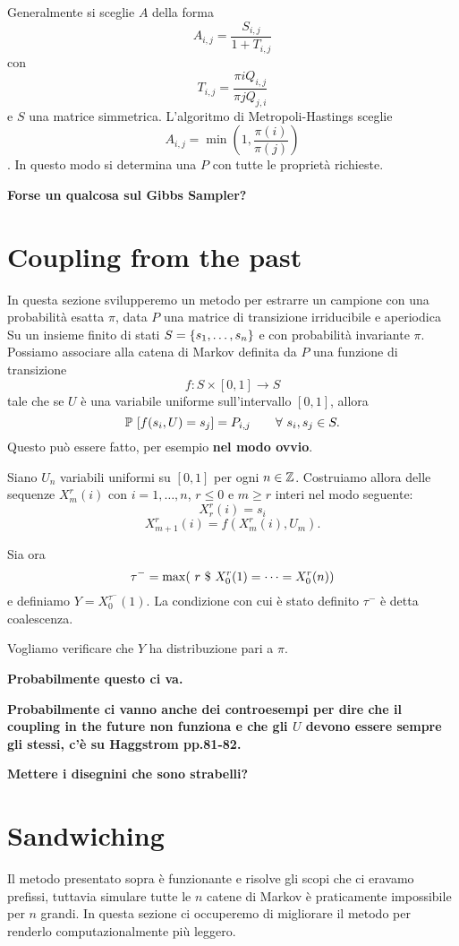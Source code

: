 \documentclass[]{marticle}
\begin{document}
Generalmente si sceglie $A$ della forma
\[
    A_{i,j} = \frac{S_{i,j}}{1+T_{i,j}}
\]
con
\[
    T_{i, j} = \frac{\pi{i} Q_{i,j}}{\pi{j} Q_{j,i}}
\]
e $S$ una matrice simmetrica.
L'algoritmo di Metropoli-Hastings sceglie
\[
    A_{i,j} = \min (1, \frac{\pi(i)}{\pi(j)})
\]
. In questo modo si determina una $P$ con tutte le propriet\`a richieste.

\textbf{Forse un qualcosa sul Gibbs Sampler?}

\section{Coupling from the past}

In questa sezione svilupperemo un metodo per estrarre un campione con una
probabilit\`a esatta $\pi$, data $P$ una matrice di transizione irriducibile e
aperiodica Su un insieme finito di stati $S=\{s_1,\dots,s_n\}$ e con
probabilit\`a invariante $\pi$. Possiamo associare alla catena di Markov
definita da $P$ una funzione di transizione 
\[
    f\colon S\times [0,1] \longrightarrow S
\]
tale che se $U$ \`e una variabile uniforme sull'intervallo $[0,1]$, allora 
\[
    \prob{f(s_i,U)=s_j}=P_{i,j} \qquad \forall s_i,s_j \in S.
\]
Questo pu\`o essere fatto, per esempio \textbf{nel modo ovvio}.

Siano $U_n$ variabili uniformi su $[0,1]$ per ogni $n\in \mathbb{Z}$. Costruiamo allora
delle sequenze $X^r_m(i)$ con $i = 1,\dots,n$, $r\leq 0$ e $m \geq r$ interi nel
modo seguente:
\[
    X^r_r(i) = s_i
\]
\[
    X^r_{m+1}(i) = f(X^r_m(i), U_m).
\]

Sia ora 
\[
    \tau^-=\max(\ r \ \$\  X^r_0(1) = \dots = X^r_0(n))
\]
e definiamo $Y = X^{\tau^-}_0(1)$. La condizione con cui \`e stato definito $\tau^-$
\`e detta coalescenza.

Vogliamo verificare che $Y$ ha distribuzione pari a $\pi$.

\textbf{Probabilmente questo ci va.}

\textbf{Probabilmente ci vanno anche dei controesempi per dire che il coupling
in the future non funziona e che gli $U$ devono essere sempre gli stessi, c'\`e
su Haggstrom pp.81-82.}

\textbf{Mettere i disegnini che sono strabelli?}
\section{Sandwiching}

Il metodo presentato sopra \`e funzionante e risolve gli scopi che ci eravamo
prefissi, tuttavia simulare tutte le $n$ catene di Markov \`e praticamente
impossibile per $n$ grandi. In questa sezione ci occuperemo di migliorare il
metodo per renderlo computazionalmente pi\`u leggero.
\end{document}
